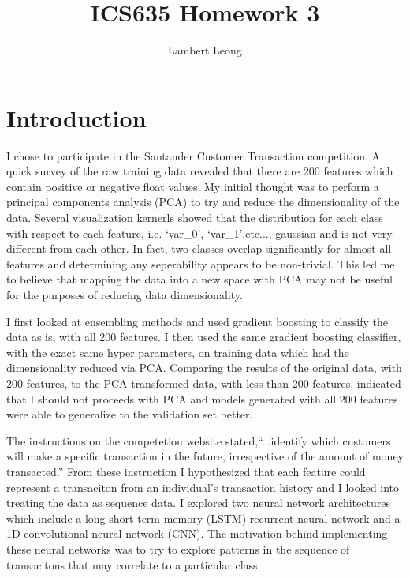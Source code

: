 \documentclass[11pt,letterpaper]{article}
\newcommand{\homework}[2]{
\setcounter{section}{#1}
\section*{ICS635 Homework {\thesection}: {#2} }
{\markboth{#2}{#2}}
}
\begin{document}
\title{ICS635 Homework 3}
\author{Lambert Leong}
\maketitle
\section{Introduction}

I chose to participate in the Santander Customer Transaction competition.  A
quick survey of the raw training data revealed that there are 200 features which
contain positive or negative float values.  My initial thought was to perform a
principal components analysis (PCA) to try and reduce the dimensionality of the
data.  Several visualization kernerls showed that the distribution for each
class with respect to each feature, i.e. `var\_0', `var\_1',etc...,  gaussian
and is not very different from each other.  In fact, two classes overlap
significantly for almost all features and determining any seperability appears
to be non-trivial.  This led me to believe that mapping the data into a new
space with PCA may not be useful for the purposes of reducing data
dimensionality.



I first looked at ensembling methods and used gradient boosting to classify the
data as is, with all 200 features.  I then used the same gradient boosting
classifier, with the exact same hyper parameters, on training data which had the
dimensionality reduced via PCA.  Comparing the results of the original data,
with 200 features, to the PCA transformed data, with less than 200 features,
indicated that I should not proceeds with PCA and models generated with all 200
features were able to generalize to the validation set better.

\iftrue
The instructions on the competetion website stated,``...identify which customers
will make a specific transaction in the future, irrespective of the amount of
money transacted.'' From these instruction I hypothesized that each feature
could represent a transaciton from an individual's transaction history and I
looked into treating the data as sequence data.  I explored two neural network
architectures which include a long short term memory (LSTM) recurrent neural
network and a 1D convolutional neural network (CNN).  The motivation behind
implementing these neural networks was to try to explore patterns in the
sequence of transacitons that may correlate to a particular class.
\fi
\end{document}
